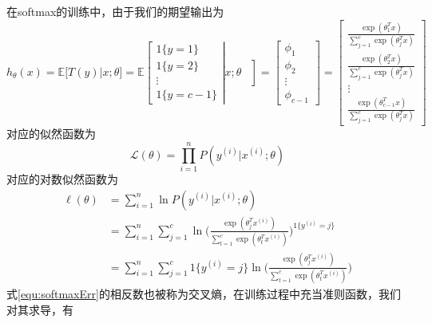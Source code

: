 在softmax的训练中，由于我们的期望输出为
\begin{equation}
h_\theta(x) =\mathbb{E}\Big[T(y)|x;\theta \Big]
=\mathbb{E}\left[
\begin{array}{cccc}
1\{y=1\}\\
1\{y=2\}\\
\vdots\\
1\{y=c-1\}
\end{array}
\right | x; \theta
\left.
\begin{array}{cccc}\\\\\\\\\end{array}
\right]
=\left[
\begin{array}{cccc}
\phi_1\\
\phi_2\\
\vdots\\
\phi_{c-1}
\end{array}
\right] 
=\left[
\begin{array}{cccc}
\frac{\exp(\theta_1^T x)}{\sum_{j=1}^c \exp(\theta_j^T x)}\\
\frac{\exp(\theta_2^T x)}{\sum_{j=1}^c \exp(\theta_j^T x)}\\
\vdots\\
\frac{\exp(\theta_{c-1}^T x)}{\sum_{j=1}^c \exp(\theta_j^T x)}
\end{array}
\right]
\end{equation}
对应的似然函数为
\begin{equation}
\mathcal{L}(\theta) = \prod\limits_{i=1}^n P(y^{(i)}|x^{(i)}; \theta)
\end{equation}
对应的对数似然函数为
\begin{equation}\label{equ:softmaxErr}
\begin{split}
\ell(\theta) &= \sum\limits_{i=1}^n\ln P(y^{(i)}|x^{(i)}; \theta)\\
&=\sum\limits_{i=1}^n\sum\limits_{j=1}^c \ln \bigg(\frac{\exp(\theta_j^Tx^{(i)})}{\sum_{t=1}^c\exp(\theta_t^T x^{(i)})} \bigg)^{1\{y^{(i)} = j\}}\\
&=\sum\limits_{i=1}^n\sum\limits_{j=1}^c 1\{y^{(i)} = j\} \ln \bigg(\frac{\exp(\theta_j^Tx^{(i)})}{\sum_{t=1}^c\exp(\theta_t^T x^{(i)})} \bigg)
\end{split}
\end{equation}
式\eqref{equ:softmaxErr}的相反数也被称为交叉熵，在训练过程中充当准则函数，我们对其求导，有
